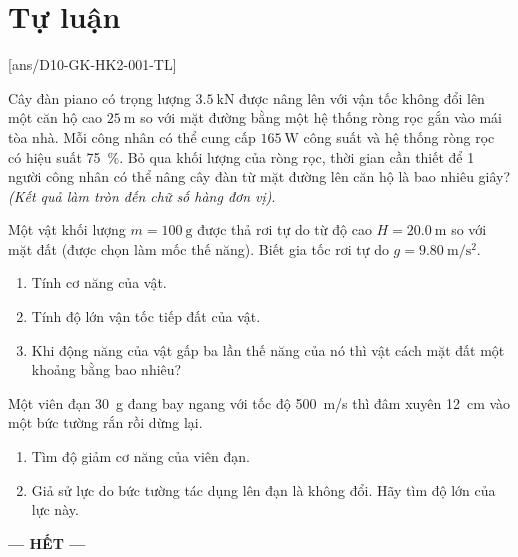 \section{Tự luận} 
\setcounter{ex}{0}
[ans/D10-GK-HK2-001-TL]
\begin{ex}
	Cây đàn piano có trọng lượng $\SI{3.5}{\kilo\newton}$ được nâng lên với vận tốc không đổi lên một căn hộ cao $\SI{25}{\meter}$ so với mặt đường bằng một hệ thống ròng rọc gắn vào mái tòa nhà. Mỗi công nhân có thể cung cấp $\SI{165}{\watt}$ công suất và hệ thống ròng rọc có hiệu suất \SI{75}{\percent}. Bỏ qua khối lượng của ròng rọc, thời gian cần thiết để 1 người công nhân có thể nâng cây đàn từ mặt đường lên căn hộ là bao nhiêu giây? \textit{(Kết quả làm tròn đến chữ số hàng đơn vị)}.
\end{ex}
\begin{ex}
	Một vật khối lượng $m=\SI{100}{\gram}$ được thả rơi tự do từ độ cao $H=\SI{20.0}{\meter}$ so với mặt đất (được chọn làm mốc thế năng). Biết gia tốc rơi tự do $g=\SI{9.80}{\meter/\second^2}$.
	\begin{enumerate}[label=\alph*)]
		\item Tính cơ năng của vật.
		\item Tính độ lớn vận tốc tiếp đất của vật.
		\item Khi động năng của vật gấp ba lần thế năng của nó thì vật cách mặt đất một khoảng bằng bao nhiêu?
	\end{enumerate}
\end{ex}
\begin{ex}
	Một viên đạn \SI{30}{\gram} đang bay ngang với tốc độ \SI{500}{\meter/\second} thì đâm xuyên \SI{12}{\centi\meter} vào một bức tường rắn rồi dừng lại.
	\begin{enumerate}[label=\alph*)]
		\item Tìm độ giảm cơ năng của viên đạn.
		\item  Giả sử lực do bức tường tác dụng lên đạn là không đổi. Hãy tìm độ lớn của lực này.
	\end{enumerate}
\end{ex}
\begin{center}
	\textbf{--- HẾT ---}
\end{center}